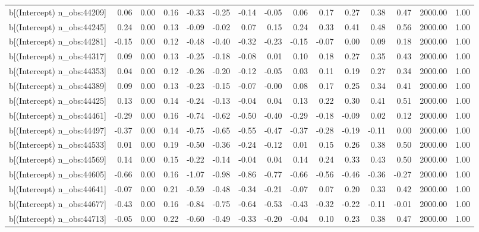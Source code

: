 \begin{table}[ht]
\begin{tabular}{rrrrrrrrrrrrrrr}
  b[(Intercept) n\_obs:44209] & 0.06 & 0.00 & 0.16 & -0.33 & -0.25 & -0.14 & -0.05 & 0.06 & 0.17 & 0.27 & 0.38 & 0.47 & 2000.00 & 1.00 \\ 
  b[(Intercept) n\_obs:44245] & 0.24 & 0.00 & 0.13 & -0.09 & -0.02 & 0.07 & 0.15 & 0.24 & 0.33 & 0.41 & 0.48 & 0.56 & 2000.00 & 1.00 \\ 
  b[(Intercept) n\_obs:44281] & -0.15 & 0.00 & 0.12 & -0.48 & -0.40 & -0.32 & -0.23 & -0.15 & -0.07 & 0.00 & 0.09 & 0.18 & 2000.00 & 1.00 \\ 
  b[(Intercept) n\_obs:44317] & 0.09 & 0.00 & 0.13 & -0.25 & -0.18 & -0.08 & 0.01 & 0.10 & 0.18 & 0.27 & 0.35 & 0.43 & 2000.00 & 1.00 \\ 
  b[(Intercept) n\_obs:44353] & 0.04 & 0.00 & 0.12 & -0.26 & -0.20 & -0.12 & -0.05 & 0.03 & 0.11 & 0.19 & 0.27 & 0.34 & 2000.00 & 1.00 \\ 
  b[(Intercept) n\_obs:44389] & 0.09 & 0.00 & 0.13 & -0.23 & -0.15 & -0.07 & -0.00 & 0.08 & 0.17 & 0.25 & 0.34 & 0.41 & 2000.00 & 1.00 \\ 
  b[(Intercept) n\_obs:44425] & 0.13 & 0.00 & 0.14 & -0.24 & -0.13 & -0.04 & 0.04 & 0.13 & 0.22 & 0.30 & 0.41 & 0.51 & 2000.00 & 1.00 \\ 
  b[(Intercept) n\_obs:44461] & -0.29 & 0.00 & 0.16 & -0.74 & -0.62 & -0.50 & -0.40 & -0.29 & -0.18 & -0.09 & 0.02 & 0.12 & 2000.00 & 1.00 \\ 
  b[(Intercept) n\_obs:44497] & -0.37 & 0.00 & 0.14 & -0.75 & -0.65 & -0.55 & -0.47 & -0.37 & -0.28 & -0.19 & -0.11 & 0.00 & 2000.00 & 1.00 \\ 
  b[(Intercept) n\_obs:44533] & 0.01 & 0.00 & 0.19 & -0.50 & -0.36 & -0.24 & -0.12 & 0.01 & 0.15 & 0.26 & 0.38 & 0.50 & 2000.00 & 1.00 \\ 
  b[(Intercept) n\_obs:44569] & 0.14 & 0.00 & 0.15 & -0.22 & -0.14 & -0.04 & 0.04 & 0.14 & 0.24 & 0.33 & 0.43 & 0.50 & 2000.00 & 1.00 \\ 
  b[(Intercept) n\_obs:44605] & -0.66 & 0.00 & 0.16 & -1.07 & -0.98 & -0.86 & -0.77 & -0.66 & -0.56 & -0.46 & -0.36 & -0.27 & 2000.00 & 1.00 \\ 
  b[(Intercept) n\_obs:44641] & -0.07 & 0.00 & 0.21 & -0.59 & -0.48 & -0.34 & -0.21 & -0.07 & 0.07 & 0.20 & 0.33 & 0.42 & 2000.00 & 1.00 \\ 
  b[(Intercept) n\_obs:44677] & -0.43 & 0.00 & 0.16 & -0.84 & -0.75 & -0.64 & -0.53 & -0.43 & -0.32 & -0.22 & -0.11 & -0.01 & 2000.00 & 1.00 \\ 
  b[(Intercept) n\_obs:44713] & -0.05 & 0.00 & 0.22 & -0.60 & -0.49 & -0.33 & -0.20 & -0.04 & 0.10 & 0.23 & 0.38 & 0.47 & 2000.00 & 1.00 \\ 

\end{tabular}
\end{table}
